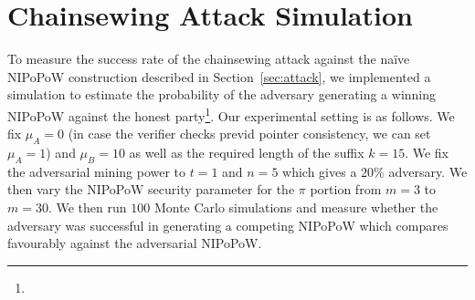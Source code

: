 \section{Chainsewing Attack Simulation}
\label{sec:simulation}

To measure the success rate of the chainsewing attack against the na\"ive NIPoPoW construction described in Section~\ref{sec:attack}, we implemented a simulation to estimate the probability of the adversary generating a winning NIPoPoW against the honest party\footnote{\fi}. Our experimental setting is as follows. We fix $\mu_A = 0$ (in case the verifier checks previd pointer consistency, we can set $\mu_A = 1$) and $\mu_B = 10$ as well as the required length of the suffix $k = 15$. We fix the adversarial mining power to $t = 1$ and $n = 5$ which gives a $20\%$ adversary. We then vary the NIPoPoW security parameter for the $\pi$ portion from $m = 3$ to $m = 30$. We then run $100$ Monte Carlo simulations and measure whether the adversary was successful in generating a competing NIPoPoW which compares favourably against the adversarial NIPoPoW.

